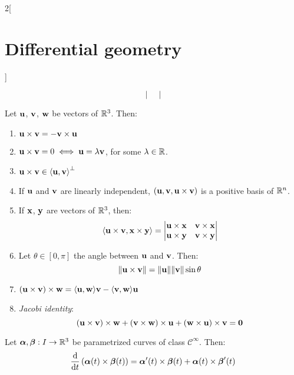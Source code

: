 \documentclass[../../../main.tex]{subfiles}
\begin{document}
\begin{multicols}{2}[\section{Differential geometry}]
\begin{prop}
$$\begin{vmatrix}
      \end{vmatrix}$$
  \end{prop}
  \begin{prop}
    Let $\vf{u}$, $\vf{v}$, $\vf{w}$ be vectors of $\RR^3$. Then:
    \begin{enumerate}
      \item $\vf{u}\times\vf{v}=-\vf{v}\times\vf{u}$
      \item $\vf{u}\times\vf{v}=0\iff\vf{u}=\lambda\vf{v}$, for some $\lambda\in\RR$.
      \item $\vf{u}\times\vf{v}\in{\langle\vf{u},\vf{v}\rangle}^{\perp}$
      \item If $\vf{u}$ and $\vf{v}$ are linearly independent, $(\vf{u},\vf{v},\vf{u}\times\vf{v})$ is a positive basis of $\RR^n$.
      \item If $\vf{x}$, $\vf{y}$ are vectors of $\RR^3$, then: $$\langle\vf{u}\times\vf{v},\vf{x}\times\vf{y}\rangle=
              \begin{vmatrix}
                \vf{u}\times\vf{x} & \vf{v}\times\vf{x} \\
                \vf{u}\times\vf{y} & \vf{v}\times\vf{y} \\
              \end{vmatrix}$$
      \item Let $\theta\in[0,\pi]$ the angle between $\vf{u}$ and $\vf{v}$. Then: $$\|\vf{u}\times\vf{v}\|=\|\vf{u}\|\|\vf{v}\|\sin\theta$$
      \item $(\vf{u}\times\vf{v})\times\vf{w}=\langle\vf{u},\vf{w}\rangle\vf{v}-\langle\vf{v},\vf{w}\rangle\vf{u}$
      \item \emph{Jacobi identity}: $$(\vf{u}\times\vf{v})\times\vf{w}+(\vf{v}\times\vf{w})\times\vf{u}+(\vf{w}\times\vf{u})\times\vf{v}=\vf{0}$$
    \end{enumerate}
  \end{prop}
  \begin{prop}
    Let $\vf{\alpha},\vf{\beta}:I\rightarrow\RR^3$ be parametrized curves of class $\mathcal{C}^\infty$. Then:
    $$\dv{}{t}\left(\vf{\alpha}(t)\times\vf{\beta}(t)\right)=\vf{\alpha}'(t)\times\vf{\beta}(t)+\vf{\alpha}(t)\times\vf{\beta}'(t)$$
  \end{prop}

\end{multicols}
\end{document}
